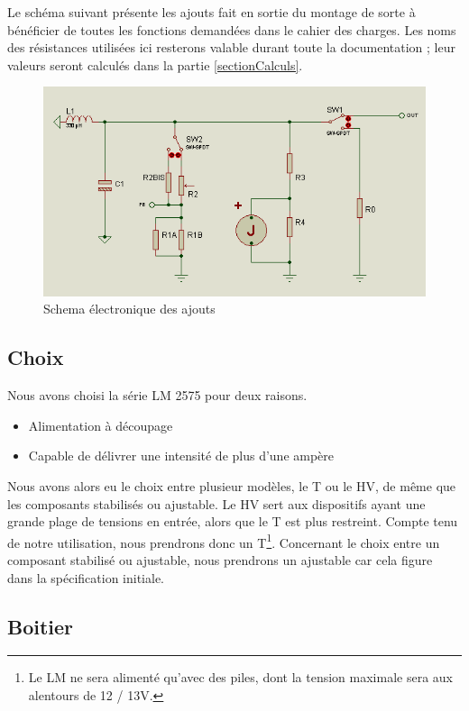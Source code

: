 \documentclass[12pt]{article}
\begin{document}
Le schéma suivant présente les ajouts fait en sortie du montage de sorte à bénéficier de toutes les fonctions
demandées dans le cahier des charges. Les noms des résistances utilisées ici resterons valable durant toute
la documentation ; leur valeurs seront calculés dans la partie \ref{sectionCalculs}.

\begin{figure}[!h]
        \centering
        \includegraphics[scale=0.6]{generatrice}
        \caption{Schema électronique des ajouts}\label{SchemaAjout}
\end{figure}


\subsection{Choix}

Nous avons choisi la série LM 2575 pour deux raisons.

\begin{itemize}
	\item Alimentation à découpage
	\item Capable de délivrer une intensité de plus d'une ampère
\end{itemize}

Nous avons alors eu le choix entre plusieur modèles, le T ou le HV, de même que les composants stabilisés ou ajustable.
Le HV sert aux dispositifs ayant une grande plage de tensions en entrée, alors que le T est plus restreint. Compte tenu
de notre utilisation, nous prendrons donc un T\footnote{Le LM ne sera alimenté qu'avec des piles, dont la tension maximale
sera aux alentours de 12 / 13V.}. Concernant le choix entre un composant stabilisé ou ajustable, nous prendrons un ajustable
car cela figure dans la spécification initiale.


\subsection{Boitier}
\end{document}
